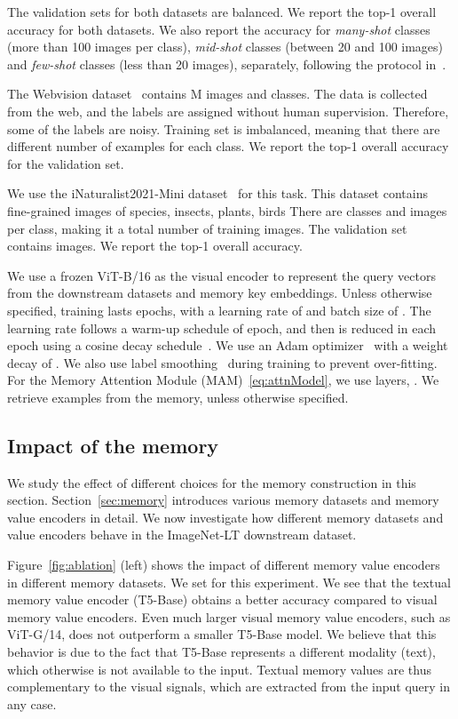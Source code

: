 The validation sets for both datasets are balanced.
We report the top-1 overall accuracy for both datasets. 
We also report the accuracy for \emph{many-shot} classes (more than 100 images per class), \emph{mid-shot} classes (between 20 and 100 images) and \emph{few-shot} classes (less than 20 images), separately, following the protocol in~\cite{OLTR}.


The Webvision dataset~\cite{li2017webvision} contains M images and  classes.
The data is collected from the web, and the labels are assigned without human supervision.
Therefore, some of the labels are noisy.
Training set is imbalanced, meaning that there are different number of examples for each class.
We report the top-1 overall accuracy for the validation set.

We use the iNaturalist2021-Mini dataset~\cite{van2021benchmarking} for this task.
This dataset contains fine-grained images of species, \eg insects, plants, birds \etc 
There are  classes and  images per class, making it a total number of  training images.
The validation set contains  images.
We report the top-1 overall accuracy.

We use a frozen ViT-B/16 as the visual encoder  to represent the query vectors from the downstream datasets and memory key embeddings.
Unless otherwise specified, training lasts  epochs, with a learning rate of  and batch size of .
The learning rate follows a warm-up schedule of  epoch, and then is reduced in each epoch using a cosine decay schedule~\cite{LH16}.
We use an Adam optimizer~\cite{kingma2017adam} with a weight decay of .
We also use label smoothing~\cite{szegedy2016rethinking} during training to prevent over-fitting.
For the Memory Attention Module (MAM)~\eqref{eq:attnModel}, we use  layers, \ie .
We retrieve  examples from the memory, unless otherwise specified.

\subsection{Impact of the memory}
\label{sec:expmemory}

We study the effect of different choices for the memory construction in this section.
Section~\ref{sec:memory} introduces various memory datasets and memory value encoders in detail. 
We now investigate how different memory datasets and value encoders behave in the ImageNet-LT downstream dataset.

Figure~\ref{fig:ablation} (left) shows the impact of different memory value encoders in different memory datasets. 
We set  for this experiment.
We see that the textual memory value encoder (T5-Base) obtains a better accuracy compared to visual memory value encoders.
Even much larger visual memory value encoders, such as ViT-G/14, does not outperform a smaller T5-Base model.
We believe that this behavior is due to the fact that T5-Base represents a different modality (text), which otherwise is not available to the input.
Textual memory values are thus complementary to the visual signals, which are extracted from the input query in any case.

